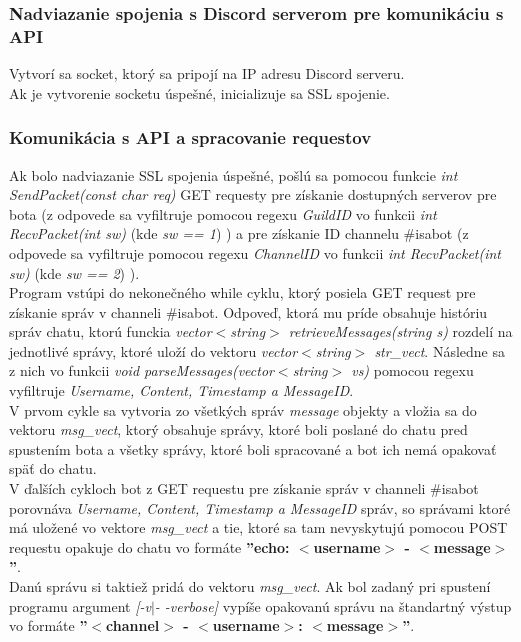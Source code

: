 \documentclass[11pt,a4paper]{article}
\begin{document}
	\subsubsection{Nadviazanie spojenia s Discord serverom pre komunikáciu s API}
	Vytvorí sa socket, ktorý sa pripojí na IP adresu Discord serveru.\\
	Ak je vytvorenie socketu úspešné, inicializuje sa SSL spojenie. 
	\subsubsection{Komunikácia s API a spracovanie requestov}
	Ak bolo nadviazanie SSL spojenia úspešné, pošlú sa pomocou funkcie \emph{int SendPacket(const char \*req)} GET requesty pre získanie dostupných serverov pre bota (z odpovede sa vyfiltruje pomocou regexu \emph{GuildID} vo funkcii \emph{int RecvPacket(int sw)} (kde \emph{sw == 1}) ) a pre získanie ID channelu \#isabot  (z odpovede sa vyfiltruje pomocou regexu \emph{ChannelID} vo funkcii \emph{int RecvPacket(int sw)} (kde \emph{sw == 2}) ).\\
	Program vstúpi do nekonečného while cyklu, ktorý posiela GET request pre získanie správ v channeli \#isabot. Odpoveď, ktorá mu príde obsahuje históriu správ chatu, ktorú funckia \emph{vector$<$string$>$ retrieveMessages(string s)} rozdelí na jednotlivé správy, ktoré uloží do vektoru \emph{vector$<$string$>$ str\_vect}. Následne sa z nich vo funkcii \emph{void parseMessages(vector$<$string$>$ vs)} pomocou regexu vyfiltruje \emph{Username, Content, Timestamp a MessageID}.\\
	V prvom cykle sa vytvoria zo všetkých správ \emph{message} objekty a vložia sa do vektoru \emph{msg\_vect}, ktorý obsahuje správy, ktoré  boli poslané do chatu pred spustením bota a všetky správy, ktoré boli spracované a bot ich nemá opakovať späť do chatu.\\
	V ďalších cykloch bot z GET requestu pre získanie správ v channeli \#isabot porovnáva \emph{Username, Content, Timestamp a MessageID} správ, so správami ktoré má uložené vo vektore \emph{msg\_vect} a tie, ktoré sa tam nevyskytujú pomocou POST requestu opakuje do chatu vo formáte \textbf{''echo: $<$username$>$ - $<$message$>$''}. \\
	Danú správu si taktiež pridá do vektoru \emph{msg\_vect}. Ak bol zadaný pri spustení programu argument \emph{[-v$\mid$- -verbose]} vypíše opakovanú správu na štandartný výstup vo formáte \textbf{''$<$channel$>$ - $<$username$>$: $<$message$>$''}.
	
\end{document}

